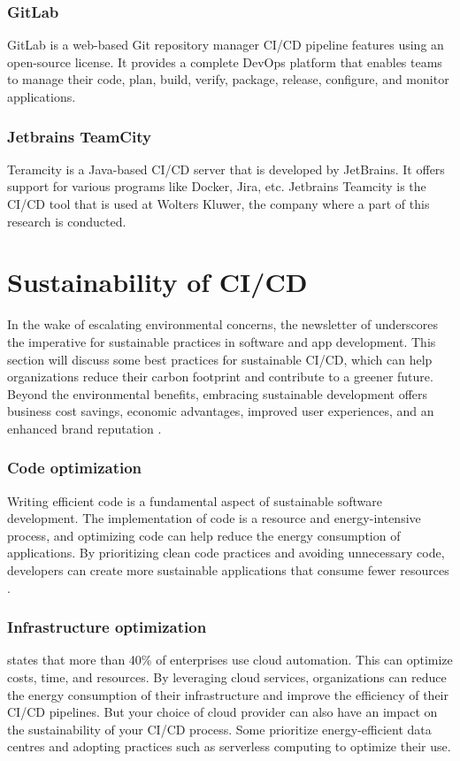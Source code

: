 \subsubsection{GitLab}
GitLab is a web-based Git repository manager CI/CD pipeline features using an open-source license.
It provides a complete DevOps platform that enables teams to manage their code, plan, build, verify, package, release, configure, and monitor applications.

\subsubsection{Jetbrains TeamCity}
Teramcity is a Java-based CI/CD server that is developed by JetBrains. It offers support for various programs like Docker, Jira, etc.
Jetbrains Teamcity is the CI/CD tool that is used at Wolters Kluwer, the company where a part of this research is conducted.



\section{Sustainability of CI/CD}
In the wake of escalating environmental concerns, the newsletter of \textcite{Corewave} underscores the imperative for sustainable practices in software and app development.
This section will discuss some best practices for sustainable CI/CD, which can help organizations reduce their carbon footprint and contribute to a greener future.
Beyond the environmental benefits, embracing sustainable development offers business cost savings, economic advantages, improved user experiences, and an enhanced brand reputation \autocite{linkedin}.

\subsubsection{Code optimization}
Writing efficient code is a fundamental aspect of sustainable software development. 
The implementation of code is a resource and energy-intensive process, and optimizing code can help reduce the energy consumption of applications.
By prioritizing clean code practices and avoiding unnecessary code, developers can create more sustainable applications that consume fewer resources \autocite{linkedin}.

\subsubsection{Infrastructure optimization} 
\textcite{colorlib} states that more than 40\% of enterprises use cloud automation. This can optimize costs, time, and resources.
By leveraging cloud services, organizations can reduce the energy consumption of their infrastructure and improve the efficiency of their CI/CD pipelines.
But your choice of cloud provider can also have an impact on the sustainability of your CI/CD process. 
Some prioritize energy-efficient data centres and adopting practices such as serverless computing to optimize their use.

